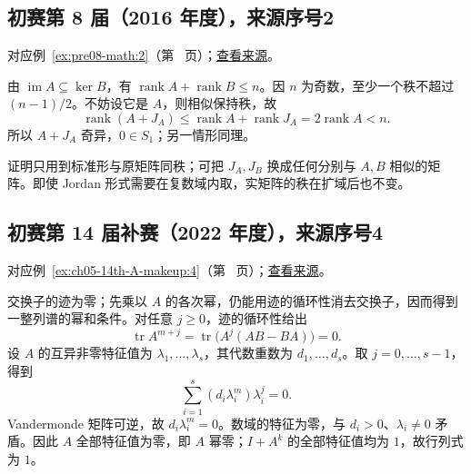\documentclass[UTF8,12pt,a4paper,fontset=fandol]{ctexart}
\begin{document}
\subsection{初赛第 8 届（2016 年度），来源序号2}\label{ans:pre08-math:2}\label{pr:pre08-math:2}

对应例~\ref{ex:pre08-math:2}（第~\pageref{ex:pre08-math:2} 页）；\href{https://github.com/lzxcr/cmc-mathematics/blob/64916fa1fdbc3e444a652eca204d5669058ee321/src/problems/preliminary/08/02.md}{查看来源}。

\begin{solve}

由 $\operatorname{im}A\subseteq\ker B$，有 $\operatorname{rank}A+\operatorname{rank}B\le n$。因 $n$ 为奇数，至少一个秩不超过 $(n-1)/2$。不妨设它是 $A$，则相似保持秩，故
\[
\operatorname{rank}(A+J_A)
\le\operatorname{rank}A+\operatorname{rank}J_A
=2\operatorname{rank}A<n.
\]
所以 $A+J_A$ 奇异，$0\in S_1$；另一情形同理。

\end{solve}

\begin{remark}[方法与条件]

证明只用到标准形与原矩阵同秩；可把 $J_A,J_B$ 换成任何分别与 $A,B$ 相似的矩阵。即使 Jordan 形式需要在复数域内取，实矩阵的秩在扩域后也不变。

\end{remark}

\subsection{初赛第 14 届补赛（2022 年度），来源序号4}\label{ans:ch05-14th-A-makeup:4}\label{pr:ch05-14th-A-makeup:4}

对应例~\ref{ex:ch05-14th-A-makeup:4}（第~\pageref{ex:ch05-14th-A-makeup:4} 页）；\href{https://github.com/lzxcr/cmc-mathematics/blob/64916fa1fdbc3e444a652eca204d5669058ee321/src/problems/preliminary/14-makeup/04.md}{查看来源}。

\begin{solve}

交换子的迹为零；先乘以 $A$ 的各次幂，仍能用迹的循环性消去交换子，因而得到一整列谱的幂和条件。对任意 $j\geq0$，迹的循环性给出
\[
\operatorname{tr}A^{m+j}
=\operatorname{tr}\bigl(A^j(AB-BA)\bigr)=0.
\]
设 $A$ 的互异非零特征值为 $\lambda_1,\ldots,\lambda_s$，其代数重数为 $d_1,\ldots,d_s$。取 $j=0,\ldots,s-1$，得到
\[
\sum_{i=1}^s(d_i\lambda_i^m)\lambda_i^j=0.
\]
Vandermonde 矩阵可逆，故 $d_i\lambda_i^m=0$。数域的特征为零，与 $d_i>0$、$\lambda_i\neq0$ 矛盾。因此 $A$ 全部特征值为零，即 $A$ 幂零；$I+A^k$ 的全部特征值均为 $1$，故行列式为 $1$。

\end{solve}
\end{document}
